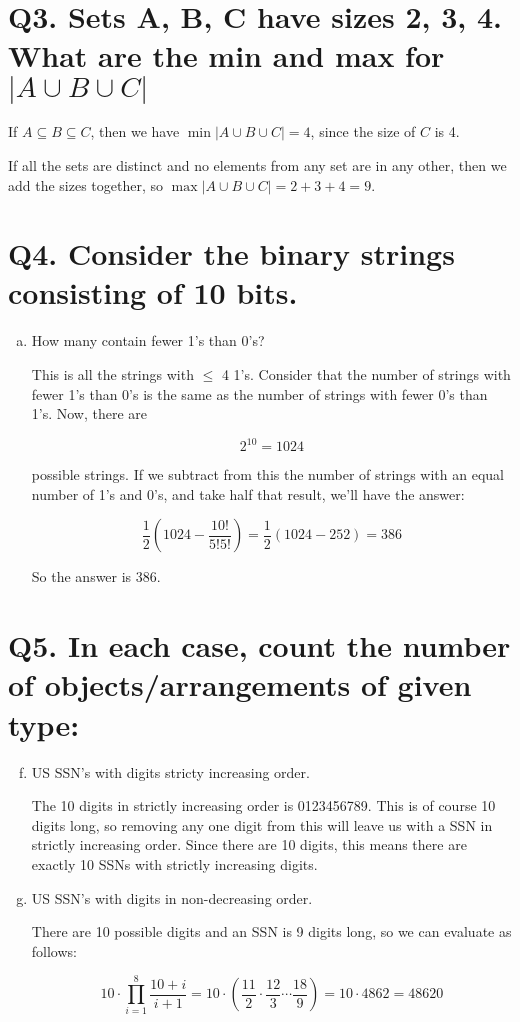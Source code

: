 \documentclass{article}
\begin{document}
\section*{Q3. \normalsize Sets A, B, C have sizes 2, 3, 4. What are the min and max for $|A\cup B\cup C|$}

If $A \subseteq B \subseteq C$, then we have $\min|A\cup B\cup C| = 4$, since the size of $C$ is 4.

\noindent If all the sets are distinct and no elements from any set are in any other, then we add the sizes together, so $\max|A\cup B\cup C| = 2 + 3 + 4 = 9$.


\section*{Q4. \normalsize Consider the binary strings consisting of 10 bits.}

\begin{enumerate}[(a)]
    \item How many contain fewer 1's than 0's?

      This is all the strings with $\leq$ 4 1's. Consider that the number of strings with fewer 1's than 0's is the same as the number of strings with fewer 0's than 1's. Now, there are 

      $$2^10 = 1024$$

      possible strings. If we subtract from this the number of strings with an equal number of 1's and 0's, and take half that result, we'll have the answer:

      $$\frac{1}{2}(1024 - \frac{10!}{5!5!}) = \frac{1}{2}(1024-252) = 386$$

      So the answer is 386.
\end{enumerate}



\section*{Q5. \normalsize In each case, count the number of objects/arrangements of given type:}

\begin{enumerate}[(a)]\setcounter{enumi}{5}
  \item US SSN's with digits stricty increasing order.
    
    The 10 digits in strictly increasing order is 0123456789. This is of course 10 digits long, so removing any one digit from this will leave us with a SSN in strictly increasing order. Since there are 10 digits, this means there are exactly 10 SSNs with strictly increasing digits.
  \item US SSN's with digits in non-decreasing order.

    There are 10 possible digits and an SSN is 9 digits long, so we can evaluate as follows: 

    $$10\cdot\prod_{i=1}^{8} \frac{10+i}{i+1} = 10\cdot(\frac{11}{2}\cdot\frac{12}{3}\cdots\frac{18}{9}) = 10\cdot4862 = 48620$$
\end{enumerate}
\end{document}
